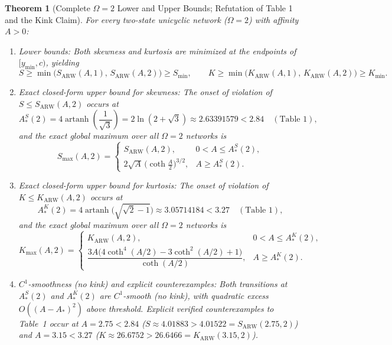 \documentclass[11pt]{article}
\newtheorem{theorem}{Theorem}
\theoremstyle{definition}
\theoremstyle{remark}
\DeclareMathOperator{\artanh}{artanh}
\begin{document}
\begin{theorem}[Complete $\Omega = 2$ Lower and Upper Bounds; Refutation of Table 1 and the Kink Claim]\label{thm:omega2}
For every two-state unicyclic network ($\Omega = 2$) with affinity $A > 0$:
\begin{enumerate}[leftmargin=2em,itemsep=4pt]
  \item \emph{Lower bounds:} Both skewness and kurtosis are minimized at the endpoints of $[y_{\min}, c)$, yielding
  \[
    S \ge \min\bigl(S_{\mathrm{ARW}}(A,1),\, S_{\mathrm{ARW}}(A,2)\bigr) \ge S_{\min},
    \qquad
    K \ge \min\bigl(K_{\mathrm{ARW}}(A,1),\, K_{\mathrm{ARW}}(A,2)\bigr) \ge K_{\min}.
  \]

  \item \emph{Exact closed-form upper bound for skewness:} The onset of violation of $S \le S_{\mathrm{ARW}}(A,2)$ occurs at
  \[
    A_*^S(2) = 4\artanh\!\left(\frac{1}{\sqrt{3}}\right) = 2\ln(2+\sqrt{3}) \approx 2.63391579 < 2.84 \quad (\text{Table~1}),
  \]
  and the exact global maximum over all $\Omega = 2$ networks is
  \[
    S_{\max}(A,2) = \begin{cases}
      S_{\mathrm{ARW}}(A,2), & 0 < A \le A_*^S(2), \\[4pt]
      2\sqrt{A}\,\bigl(\coth\frac{A}{2}\bigr)^{3/2}, & A \ge A_*^S(2).
    \end{cases}
  \]

  \item \emph{Exact closed-form upper bound for kurtosis:} The onset of violation of $K \le K_{\mathrm{ARW}}(A,2)$ occurs at
  \[
    A_*^K(2) = 4\artanh\!\bigl(\sqrt{\sqrt{2}-1}\bigr) \approx 3.05714184 < 3.27 \quad (\text{Table~1}),
  \]
  and the exact global maximum over all $\Omega = 2$ networks is
  \[
    K_{\max}(A,2) = \begin{cases}
      K_{\mathrm{ARW}}(A,2), & 0 < A \le A_*^K(2), \\[6pt]
      \dfrac{3A\bigl(4\coth^4(A/2) - 3\coth^2(A/2) + 1\bigr)}{\coth(A/2)}, & A \ge A_*^K(2).
    \end{cases}
  \]

  \item \emph{$C^1$-smoothness (no kink) and explicit counterexamples:} Both transitions at $A_*^S(2)$ and $A_*^K(2)$ are $C^1$-smooth (no kink), with quadratic excess $O((A - A_*)^2)$ above threshold. Explicit verified counterexamples to Table~1 occur at $A = 2.75 < 2.84$ ($S \approx 4.01883 > 4.01522 = S_{\mathrm{ARW}}(2.75, 2)$) and $A = 3.15 < 3.27$ ($K \approx 26.6752 > 26.6466 = K_{\mathrm{ARW}}(3.15, 2)$).
\end{enumerate}
\end{theorem}
\end{document}
